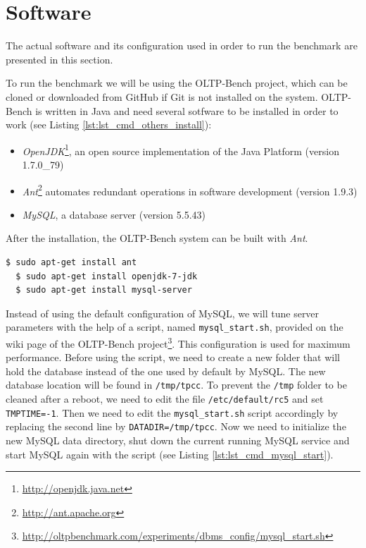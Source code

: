 \section{Software}
\label{sec:softwares}
The actual software and its configuration used in order to run the benchmark are presented in this section.

To run the benchmark we will be using the OLTP-Bench project, which can be cloned 
or downloaded from GitHub if Git is not installed on the system. 
OLTP-Bench is written in Java and need several sotfware to be installed in order to work (see Listing \ref{lst:lst_cmd_others_install}): 

{
\singlespacing
\begin{itemize}
\item \textit{OpenJDK}\footnote{\url{http://openjdk.java.net}}, an open source implementation of the Java Platform (version 1.7.0\_79)
\item \textit{Ant}\footnote{\url{http://ant.apache.org}} automates redundant operations in software development (version 1.9.3)
\item \textit{MySQL}, a database server (version 5.5.43)
\end{itemize}
}

After the installation, the OLTP-Bench system can be built with \textit{Ant}.

{
\singlespacing
\begin{lstlisting}[frame=single,language=bash,caption={Ant, Java and MySQL installation},label={lst:lst_cmd_others_install}]
  $ sudo apt-get install ant
  $ sudo apt-get install openjdk-7-jdk
  $ sudo apt-get install mysql-server
\end{lstlisting}
}

Instead of using the default configuration of MySQL, we will tune server parameters with the help of a script, 
named \texttt{mysql\_start.sh}, provided on the wiki page of the OLTP-Bench 
project\footnote{\url{http://oltpbenchmark.com/experiments/dbms_config/mysql_start.sh}}. 
This configuration is used for maximum performance. 
Before using the script, we need to create a new folder that will hold the database instead of the one used by default by MySQL. 
The new database location will be found in \texttt{/tmp/tpcc}. 
To prevent the \texttt{/tmp} folder to be cleaned after a reboot, we need to edit the file \texttt{/etc/default/rc5} and set \texttt{TMPTIME=-1}. 
Then we need to edit the \texttt{mysql\_start.sh} script accordingly by replacing the second line by \texttt{DATADIR=/tmp/tpcc}. 
Now we need to initialize the new MySQL data directory, shut down the current running MySQL service and start MySQL again with the script (see Listing \ref{lst:lst_cmd_mysql_start}).

